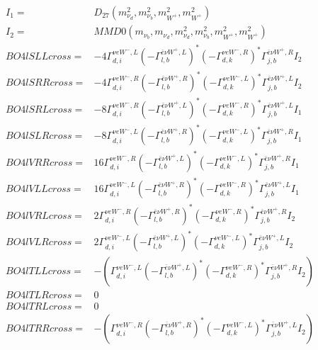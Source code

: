 \documentclass[A4,landscape]{article}
\begin{document}
\begin{align} 
I_1 = & D_{27}(m^2_{\nu_{{d}}}, m^2_{\nu_{{b}}}, m^2_{W^+}, m^2_{W^+}) \\ 
I_2 = & MMD0(m_{\nu_{{b}}}, m_{\nu_{{d}}}, m^2_{\nu_{{d}}}, m^2_{\nu_{{b}}}, m^2_{W^+}, m^2_{W^+}) \\ 
  BO4lSLLcross= & -4  \Gamma^{\nu e W^-,L}_{d, i} (- \Gamma^{\bar{e}\nu W^+ ,L} _{l, b})^* (- \Gamma^{\nu e W^-,R} _{d, k})^* \Gamma^{\bar{e}\nu W^+ ,R}_{j, b} I_2 \\ 
  BO4lSRRcross= & -4  \Gamma^{\nu e W^-,R}_{d, i} (- \Gamma^{\bar{e}\nu W^+ ,R} _{l, b})^* (- \Gamma^{\nu e W^-,L} _{d, k})^* \Gamma^{\bar{e}\nu W^+ ,L}_{j, b} I_2 \\ 
  BO4lSRLcross= & -8  \Gamma^{\nu e W^-,R}_{d, i} (- \Gamma^{\bar{e}\nu W^+ ,L} _{l, b})^* (- \Gamma^{\nu e W^-,R} _{d, k})^* \Gamma^{\bar{e}\nu W^+ ,L}_{j, b} I_1 \\ 
  BO4lSLRcross= & -8  \Gamma^{\nu e W^-,L}_{d, i} (- \Gamma^{\bar{e}\nu W^+ ,R} _{l, b})^* (- \Gamma^{\nu e W^-,L} _{d, k})^* \Gamma^{\bar{e}\nu W^+ ,R}_{j, b} I_1 \\ 
  BO4lVRRcross= & 16  \Gamma^{\nu e W^-,R}_{d, i} (- \Gamma^{\bar{e}\nu W^+ ,L} _{l, b})^* (- \Gamma^{\nu e W^-,L} _{d, k})^* \Gamma^{\bar{e}\nu W^+ ,R}_{j, b} I_1 \\ 
  BO4lVLLcross= & 16  \Gamma^{\nu e W^-,L}_{d, i} (- \Gamma^{\bar{e}\nu W^+ ,R} _{l, b})^* (- \Gamma^{\nu e W^-,R} _{d, k})^* \Gamma^{\bar{e}\nu W^+ ,L}_{j, b} I_1 \\ 
  BO4lVRLcross= & 2  \Gamma^{\nu e W^-,R}_{d, i} (- \Gamma^{\bar{e}\nu W^+ ,R} _{l, b})^* (- \Gamma^{\nu e W^-,R} _{d, k})^* \Gamma^{\bar{e}\nu W^+ ,R}_{j, b} I_2 \\ 
  BO4lVLRcross= & 2  \Gamma^{\nu e W^-,L}_{d, i} (- \Gamma^{\bar{e}\nu W^+ ,L} _{l, b})^* (- \Gamma^{\nu e W^-,L} _{d, k})^* \Gamma^{\bar{e}\nu W^+ ,L}_{j, b} I_2 \\ 
  BO4lTLLcross= & -( \Gamma^{\nu e W^-,L}_{d, i} (- \Gamma^{\bar{e}\nu W^+ ,L} _{l, b})^* (- \Gamma^{\nu e W^-,R} _{d, k})^* \Gamma^{\bar{e}\nu W^+ ,R}_{j, b} I_2) \\ 
  BO4lTLRcross= & 0 \\ 
  BO4lTRLcross= & 0 \\ 
  BO4lTRRcross= & -( \Gamma^{\nu e W^-,R}_{d, i} (- \Gamma^{\bar{e}\nu W^+ ,R} _{l, b})^* (- \Gamma^{\nu e W^-,L} _{d, k})^* \Gamma^{\bar{e}\nu W^+ ,L}_{j, b} I_2) \\ 
\end{align} 
\end{document}
